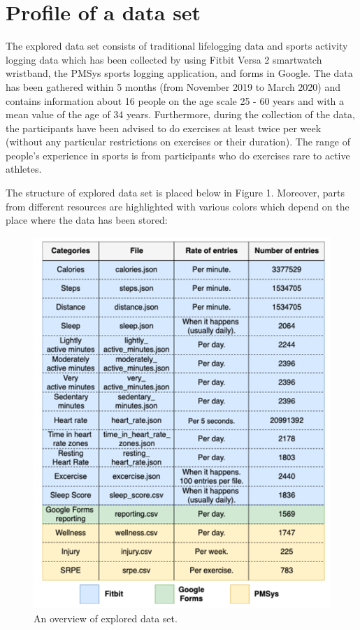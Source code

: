 \documentclass[runningheads]{llncs}
\begin{document}
\section{Profile of a data set}
The explored data set consists of traditional lifelogging data and sports activity logging data which has been collected by using Fitbit Versa 2 smartwatch wristband, the PMSys sports logging application, and forms in Google. The data has been gathered within 5 months (from November 2019 to March 2020) and contains information about 16 people on the age scale 25 - 60 years and with a mean value of the age of 34 years. Furthermore, during the collection of the data, the participants have been advised to do exercises at least twice per week (without any particular restrictions on exercises or their duration). The range of people's experience in sports is from participants who do exercises rare to active athletes.

The structure of explored data set is placed below in Figure 1. Moreover, parts from different resources are highlighted with various colors which depend on the place where the data has been stored:

\begin{figure}[h]
\centerline{\includegraphics{structure.png}}
\caption{An overview of explored data set.}
\label{fig}
\end{figure}
\end{document}
